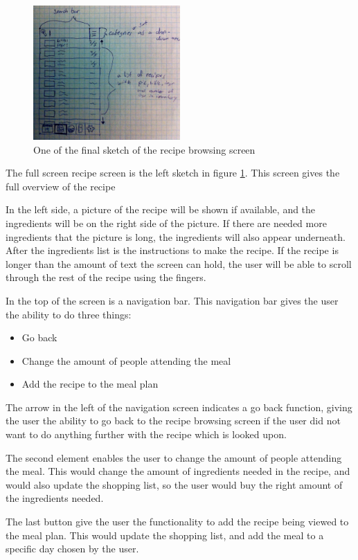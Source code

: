 \begin{figure}[H]
    \centering
    \includegraphics[width=0.5\textwidth]{Grafik/FoodPlanner/FinalRecipeBrowsingSketch1}
    \caption{One of the final sketch of the recipe browsing screen}
    \label{FinalRecipeBrowsingSketch1}
\end{figure}

The full screen recipe screen is the left sketch in figure \ref{FinalRecipeBrowsingSketch1}. This screen gives the full overview of the recipe

In the left side, a picture of the recipe will be shown if available, and the ingredients will be on the right side of the picture. If there are needed more ingredients that the picture is long, the ingredients will also appear underneath. After the ingredients list is the instructions to make the recipe. If the recipe is longer than the amount of text the screen can hold, the user will be able to scroll through the rest of the recipe using the fingers.

In the top of the screen is a navigation bar. This navigation bar gives the user the ability to do three things:

\begin{itemize}
    \item Go back
    \item Change the amount of people attending the meal
    \item Add the recipe to the meal plan
\end{itemize}

The arrow in the left of the navigation screen indicates a go back function, giving the user the ability to go back to the recipe browsing screen if the user did not want to do anything further with the recipe which is looked upon.

The second element enables the user to change the amount of people attending the meal. This would change the amount of ingredients needed in the recipe, and would also update the shopping list, so the user would buy the right amount of the ingredients needed.

The last button give the user the functionality to add the recipe being viewed to the meal plan. This would update the shopping list, and add the meal to a specific day chosen by the user.